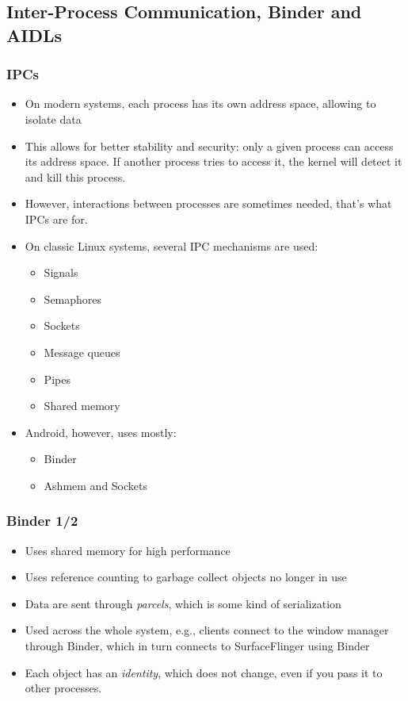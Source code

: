 \subsection[IPCs, Binder and AIDLs]{Inter-Process Communication, Binder and AIDLs}
\begin{frame}
  \frametitle{IPCs}
  \begin{itemize}
  \item On modern systems, each process has its own address space,
    allowing to isolate data
  \item This allows for better stability and security: only a given
    process can access its address space. If another process tries to
    access it, the kernel will detect it and kill this process.
  \item However, interactions between processes are sometimes needed,
    that's what IPCs are for.
  \item On classic Linux systems, several IPC mechanisms are used:
    \begin{itemize}
    \item Signals
    \item Semaphores
    \item Sockets
    \item Message queues
    \item Pipes
    \item Shared memory
    \end{itemize}
  \item Android, however, uses mostly:
    \begin{itemize}
    \item Binder
    \item Ashmem and Sockets
    \end{itemize}
  \end{itemize}
\end{frame}

\begin{frame}
  \frametitle{Binder 1/2}
  \begin{itemize}
  \item Uses shared memory for high performance
  \item Uses reference counting to garbage collect objects no longer
    in use
  \item Data are sent through \emph{parcels}, which is some kind of
    serialization
  \item Used across the whole system, e.g., clients connect to the
    window manager through Binder, which in turn connects to
    SurfaceFlinger using Binder
  \item Each object has an \emph{identity}, which does not change,
    even if you pass it to other processes.
  \end{itemize}
\end{frame}

